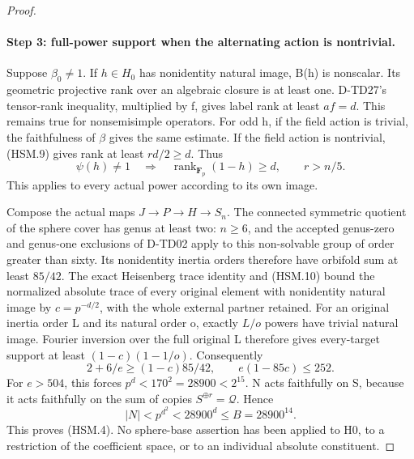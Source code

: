 \begin{proof}
\paragraph{Step 3: full-power support when the alternating action is nontrivial.}
Suppose \(\beta_0\ne1\).  If \(h\in H_0\) has
nonidentity natural image, B(h) is nonscalar.  Its geometric
projective rank over an algebraic closure is at least one.
D-TD27's tensor-rank inequality, multiplied by f, gives label
rank at least \(af=d\).  This remains true for nonsemisimple
operators.  For odd h, if the field action is trivial, the
faithfulness of \(\beta\) gives the same estimate.  If the
field action is nontrivial, (HSM.9) gives rank at least
\(rd/2\ge d\).  Thus
\[
 \psi(h)\ne1\quad\Longrightarrow\quad
 \operatorname{rank}_{\mathbf F_p}(1-h)\ge d,
 \qquad r>n/5.
 \tag{HSM.10}
\]
This applies to every actual power according to its own image.

Compose the actual maps \(J\to P\to H\to S_n\).
The connected symmetric quotient of the sphere cover has genus
at least two: \(n\ge6\), and the accepted genus-zero and
genus-one exclusions of D-TD02 apply to this non-solvable group
of order greater than sixty.  Its nonidentity inertia orders
therefore have orbifold sum at least \(85/42\).
The exact Heisenberg trace identity and (HSM.10) bound the
normalized absolute trace of every original element with
nonidentity natural image by \(c=p^{-d/2}\), with the whole
external partner retained.  For an original inertia order L
and its natural order o, exactly \(L/o\) powers have trivial
natural image.  Fourier inversion over the full original L
therefore gives every-target support at least
\((1-c)(1-1/o)\).  Consequently
\[
 2+6/e\ge(1-c)85/42,
 \qquad e(1-85c)\le252.
 \tag{HSM.11}
\]
For \(e>504\), this forces \(p^d<170^2=28900<2^{15}\).
N acts faithfully on S, because it acts faithfully on the sum
of copies \(S^{\oplus r}=\mathcal Q\).  Hence
\[
 |N|<p^{d^2}<28900^d\le B=28900^{14}.
 \tag{HSM.12}
\]
This proves (HSM.4).  No sphere-base assertion has been applied
to H0, to a restriction of the coefficient space, or to an
individual absolute constituent.


\end{proof}
